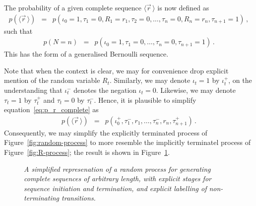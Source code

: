 \documentclass[a4paper]{article}
\begin{document}
The probability of a given complete sequence $\langle\vec{r}\,\rangle$ is now defined as
\begin{eqnarray}
   p(\langle\vec{r}\,\rangle)
& = & p(\iota_0\!=\!1,\tau_1\!=\!0,R_1=r_1,\tau_2\!=\!0,\ldots,\tau_n\!=\!0,R_n=r_n,\tau_{n+1}\!=\!1)
\label{eq:p_r_complete}
\,,
\end{eqnarray}
such that 
\begin{eqnarray}
   p(N\!=\!n) & = &  p(\iota_0\!=\!1,\tau_1\!=\!0,\ldots,\tau_n\!=\!0,\tau_{n+1}\!=\!1)\,.
\end{eqnarray}
This has the form of a generalised Bernoulli sequence.

Note that when the context is clear, we may for convenience drop explicit mention of the random variable $R_t$.
Similarly, we may denote $\iota_t=1$ by $\iota^+_t$, on the understanding that $\iota^-_t$ denotes the negation $\iota_t=0$.
Likewise, we may denote $\tau_t=1$ by $\tau^+_t$ and $\tau_t=0$ by $\tau^-_t$.
Hence, it is plausible to simplify equation~\eqref{eq:p_r_complete} as
\begin{eqnarray}
p(\langle\vec{r}\,\rangle) 
& = & p(\iota_0^+,\tau^-_1,r_1,\ldots,\tau^-_n,r_n,\tau^+_{n+1})\,.
\end{eqnarray}
Consequently, we may simplify the explicitly terminated process of Figure~\ref{fig:random-process} 
to more resemble the implicitly terminatel process of Figure~\ref{fig:R-process}; the result is shown in Figure~\ref{fig:simple-random-process}.
\begin{figure}[hbt]
\centering
{}
\caption{\em A simplified represenation of a random process for generating complete sequences of arbitrary length,
with explicit stages for sequence initiation and termination, and explicit labelling of non-terminating transitions.}
\label{fig:simple-random-process}
\end{figure}
\end{document}
